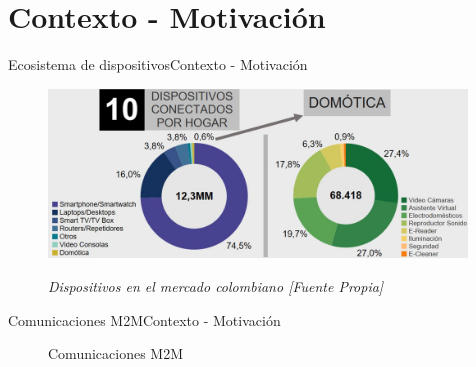 \section{Contexto - Motivación}
\begin{frame}{Ecosistema de dispositivos}{Contexto - Motivación}
    \begin{figure}				
		{\includegraphics[width=0.99\textwidth,keepaspectratio]{Sustentacion/Figures/DispositivosColombia.JPG}}
		\caption{\small \sl Dispositivos en el mercado colombiano [Fuente Propia]}
		\label{figure:Ecosistema}
    \end{figure}
\end{frame}
\begin{frame}{Comunicaciones M2M}{Contexto - Motivación}
\begin{figure}[htbp]
	    \centering
	    \caption{Comunicaciones M2M \cite{DoWeNeed}}
	    \label{fig:M2M}
    \end{figure}
\end{frame}
